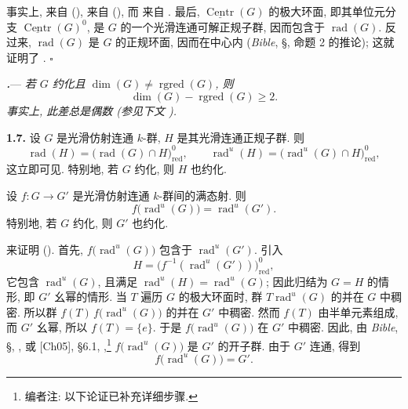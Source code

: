 事实上,  来自 (),  来自 (), 而  来自 . 最后, \(\underline{\operatorname{Centr}}(G)\) 的极大环面, 即其单位元分支 \(\underline{\operatorname{Centr}}(G)^{0}\), 是 \(G\) 的一个光滑连通可解正规子群, 因而包含于 \(\operatorname{rad}(G)\). 反过来, \(\operatorname{rad}(G)\) 是 \(G\) 的正规环面, 因而在中心内 (\emph{Bible}, §, 命题 2 的推论); 这就证明了 .
\hfill\(\square\)

\par\medskip\noindent
{}\textbf{\textit{.}}---
\textit{若 \(G\) 约化且 \(\dim(G)\ne\operatorname{rgred}(G)\), 则
\[
  \dim(G)-\operatorname{rgred}(G)\geq 2.
\]
事实上, 此差总是偶数 (参见下文 ).}

\par\medskip\noindent{}\textbf{1.7.}\quad
设 \(G\) 是光滑仿射连通 \(k\)-群, \(H\) 是其光滑连通正规子群. 则
\begin{equation}
  \operatorname{rad}(H)
  =
  \bigl(\operatorname{rad}(G)\cap H\bigr)_{\mathrm{red}}^{0},
  \qquad
  \operatorname{rad}^{u}(H)
  =
  \bigl(\operatorname{rad}^{u}(G)\cap H\bigr)_{\mathrm{red}}^{0},
  \tag{1.7.1}
\end{equation}
这立即可见. 特别地, 若 \(G\) 约化, 则 \(H\) 也约化.

设 \(f:G\longrightarrow G'\) 是光滑仿射连通 \(k\)-群间的满态射. 则
\begin{equation}
  f\bigl(\operatorname{rad}^{u}(G)\bigr)
  =
  \operatorname{rad}^{u}(G').
  \tag{1.7.2}
\end{equation}
特别地, 若 \(G\) 约化, 则 \(G'\) 也约化.

来证明 (). 首先,
\(f\bigl(\operatorname{rad}^{u}(G)\bigr)\) 包含于 \(\operatorname{rad}^{u}(G')\). 引入
\[
  H=
  \bigl(f^{-1}(\operatorname{rad}^{u}(G'))\bigr)_{\mathrm{red}}^{0},
\]
它包含 \(\operatorname{rad}^{u}(G)\), 且满足
\(\operatorname{rad}^{u}(H)=\operatorname{rad}^{u}(G)\); 因此归结为 \(G=H\) 的情形, 即 \(G'\) 幺幂的情形. 当 \(T\) 遍历 \(G\) 的极大环面时, 群 \(T\operatorname{rad}^{u}(G)\) 的并在 \(G\) 中稠密. 所以群 \(f(T)\,f\bigl(\operatorname{rad}^{u}(G)\bigr)\) 的并在 \(G'\) 中稠密. 然而 \(f(T)\) 由半单元素组成, 而 \(G'\) 幺幂, 所以 \(f(T)=\{e\}\). 于是 \(f\bigl(\operatorname{rad}^{u}(G)\bigr)\) 在 \(G'\) 中稠密. 因此, 由 \emph{Bible}, §, , 或 [Ch05], §6.1, ,\footnote{编者注: 以下论证已补充详细步骤.}
\(f\bigl(\operatorname{rad}^{u}(G)\bigr)\) 是 \(G'\) 的开子群. 由于 \(G'\) 连通, 得到
\[
  f\bigl(\operatorname{rad}^{u}(G)\bigr)=G'.
\]

